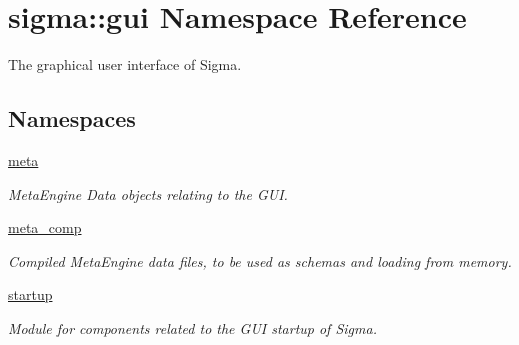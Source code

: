 \hypertarget{namespacesigma_1_1gui}{}\section{sigma\+:\+:gui Namespace Reference}
\label{namespacesigma_1_1gui}


The graphical user interface of Sigma.  


\subsection*{Namespaces}
\begin{DoxyCompactItemize}
\item 
 \hyperlink{namespacesigma_1_1gui_1_1meta}{meta}
\begin{DoxyCompactList}\small\item\em Meta\+Engine Data objects relating to the G\+U\+I. \end{DoxyCompactList}\item 
 \hyperlink{namespacesigma_1_1gui_1_1meta__comp}{meta\+\_\+comp}
\begin{DoxyCompactList}\small\item\em Compiled Meta\+Engine data files, to be used as schema\textquotesingle{}s and loading from memory. \end{DoxyCompactList}\item 
 \hyperlink{namespacesigma_1_1gui_1_1startup}{startup}
\begin{DoxyCompactList}\small\item\em Module for components related to the G\+U\+I startup of Sigma. \end{DoxyCompactList}\end{DoxyCompactItemize}
